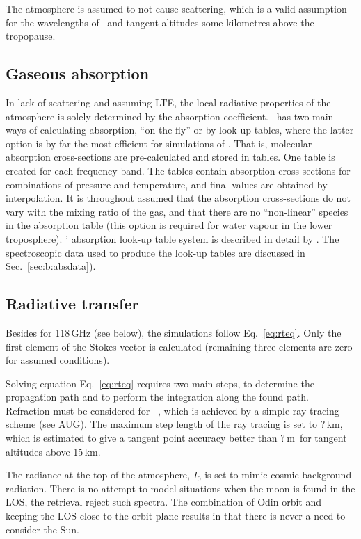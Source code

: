 The atmosphere is assumed to not cause scattering, which is a valid assumption
for the wavelengths of \smr\ and tangent altitudes some kilometres above the
tropopause. 


\subsection{Gaseous absorption}
%
In lack of scattering and assuming LTE, the local radiative properties of the
atmosphere is solely determined by the absorption coefficient. \ARTS\ has two
main ways of calculating absorption, ``on-the-fly'' or by look-up tables, where
the latter option is by far the most efficient for simulations of \smr. That
is, molecular absorption cross-sections are pre-calculated and stored in
tables. One table is created for each frequency band. The tables contain
absorption cross-sections for combinations of pressure and temperature, and
final values are obtained by interpolation. It is throughout assumed that the
absorption cross-sections do not vary with the mixing ratio of the gas, and that
there are no ``non-linear'' species in the absorption table (this option is
required for water vapour in the lower troposphere).
\ARTS' absorption look-up table system is described in detail by
\citet{buehler:absor:11}. The spectroscopic data used to produce the look-up
tables are discussed in Sec.~\ref{sec:b:absdata}).


\subsection{Radiative transfer}
%
Besides for 118\,GHz (see below), the simulations follow Eq.~\ref{eq:rteq}. Only
the first element of the Stokes vector is calculated (remaining three elements
are zero for assumed conditions).

Solving equation Eq.~\ref{eq:rteq} requires two main steps, to determine the
propagation path and to perform the integration along the found path.
Refraction must be considered for \smr\ \citep{eriksson:studi:02}, which is
achieved by a simple ray tracing scheme (see AUG). The maximum step length of
the ray tracing is set to ?\,km, which is estimated to give a
tangent point accuracy better than ?\,m\ for tangent altitudes
above 15\,km.

The radiance at the top of the atmosphere, $I_0$ is set to mimic cosmic
background radiation. There is no attempt to model situations when the moon is
found in the LOS, the retrieval reject such spectra. The combination of Odin
orbit and keeping the LOS close to the orbit plane results in that there is
never a need to consider the Sun.



